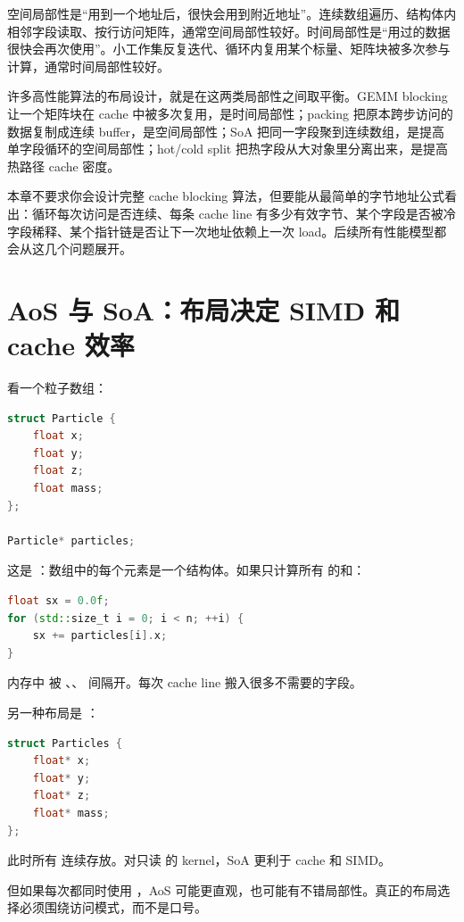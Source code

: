 空间局部性是“用到一个地址后，很快会用到附近地址”。连续数组遍历、结构体内相邻字段读取、按行访问矩阵，通常空间局部性较好。时间局部性是“用过的数据很快会再次使用”。小工作集反复迭代、循环内复用某个标量、矩阵块被多次参与计算，通常时间局部性较好。

许多高性能算法的布局设计，就是在这两类局部性之间取平衡。GEMM blocking 让一个矩阵块在 cache 中被多次复用，是时间局部性；packing 把原本跨步访问的数据复制成连续 buffer，是空间局部性；SoA 把同一字段聚到连续数组，是提高单字段循环的空间局部性；hot/cold split 把热字段从大对象里分离出来，是提高热路径 cache 密度。

本章不要求你会设计完整 cache blocking 算法，但要能从最简单的字节地址公式看出：循环每次访问是否连续、每条 cache line 有多少有效字节、某个字段是否被冷字段稀释、某个指针链是否让下一次地址依赖上一次 load。后续所有性能模型都会从这几个问题展开。

\section{AoS 与 SoA：布局决定 SIMD 和 cache 效率}

看一个粒子数组：

\begin{lstlisting}[language=C++]
struct Particle {
    float x;
    float y;
    float z;
    float mass;
};

Particle* particles;
\end{lstlisting}

这是 ：数组中的每个元素是一个结构体。如果只计算所有  的和：

\begin{lstlisting}[language=C++]
float sx = 0.0f;
for (std::size_t i = 0; i < n; ++i) {
    sx += particles[i].x;
}
\end{lstlisting}

内存中  被 、、 间隔开。每次 cache line 搬入很多不需要的字段。

另一种布局是 ：

\begin{lstlisting}[language=C++]
struct Particles {
    float* x;
    float* y;
    float* z;
    float* mass;
};
\end{lstlisting}

此时所有  连续存放。对只读  的 kernel，SoA 更利于 cache 和 SIMD。

但如果每次都同时使用 ，AoS 可能更直观，也可能有不错局部性。真正的布局选择必须围绕访问模式，而不是口号。

